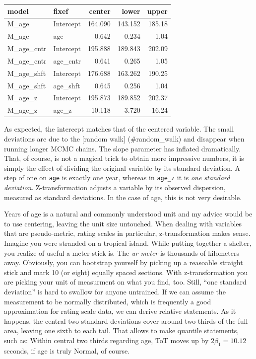 \documentclass[]{svmono}
\theoremstyle{definition}
\theoremstyle{definition}
\theoremstyle{definition}
\theoremstyle{remark}
\begin{document}
\begin{longtable}[]{@{}llrrr@{}}
\toprule
model & fixef & center & lower & upper\tabularnewline
\midrule
\endhead
M\_age & Intercept & 164.090 & 143.152 & 185.18\tabularnewline
M\_age & age & 0.642 & 0.234 & 1.04\tabularnewline
M\_age\_cntr & Intercept & 195.888 & 189.843 & 202.09\tabularnewline
M\_age\_cntr & age\_cntr & 0.641 & 0.265 & 1.05\tabularnewline
M\_age\_shft & Intercept & 176.688 & 163.262 & 190.25\tabularnewline
M\_age\_shft & age\_shft & 0.645 & 0.256 & 1.04\tabularnewline
M\_age\_z & Intercept & 195.873 & 189.852 & 202.37\tabularnewline
M\_age\_z & age\_z & 10.118 & 3.720 & 16.24\tabularnewline
\bottomrule
\end{longtable}

As expected, the intercept matches that of the centered variable. The
small deviations are due to the {[}random walk{]} (\#random\_walk) and
disappear when running longer MCMC chains. The slope parameter has
inflated dramatically. That, of course, is not a magical trick to obtain
more impressive numbers, it is simply the effect of dividing the
original variable by its standard deviation. A step of one on
\texttt{age} is exactly one year, whereas in \texttt{age\_z} it is
\emph{one standard deviation}. Z-transformation adjusts a variable by
its observed dispersion, measured as standard deviations. In the case of
age, this is not very desirable.

Years of age is a natural and commonly understood unit and my advice
would be to use centering, leaving the unit size untouched. When dealing
with variables that are pseudo-metric, rating scales in particular,
z-transformation makes sense. Imagine you were stranded on a tropical
island. While putting together a shelter, you realize of useful a meter
stick is. The \emph{ur meter} is thousands of kilometers away.
Obviously, you can bootstrap yourself by picking up a reasoable straight
stick and mark 10 (or eight) equally spaced sections. With
z-transformation you are picking your unit of measurment on what you
find, too. Still, ``one standard deviation'' is hard to swallow for
anyone untrained. If we can assume the measurement to be normally
distributed, which is frequently a good approximation for rating scale
data, we can derive relative statements. As it happens, the central two
standard deviations cover around two thirds of the full area, leaving
one sixth to each tail. That allows to make quantile statements, such
as: Within central two thirds regarding age, ToT moves up by
\(2 \beta_1 = 10.12\) seconds, if age is truly Normal, of course.
\end{document}

